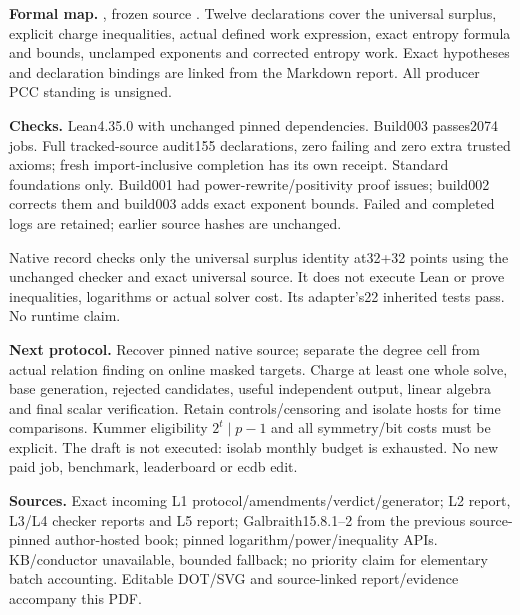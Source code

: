 \documentclass[11pt]{article}
\begin{document}
\textbf{Formal map.} , frozen source
. Twelve declarations cover the universal surplus, explicit
charge inequalities, actual defined work expression, exact entropy formula
and bounds, unclamped exponents and corrected entropy work. Exact hypotheses
and declaration bindings are linked from the Markdown report. All producer
PCC standing is unsigned.

\textbf{Checks.} Lean4.35.0 with unchanged pinned dependencies. Build003
passes2074 jobs. Full tracked-source audit155 declarations, zero failing and
zero extra trusted axioms; fresh import-inclusive completion has its own
receipt. Standard foundations only. Build001 had power-rewrite/positivity
proof issues; build002 corrects them and build003 adds exact exponent bounds.
Failed and completed logs are retained; earlier source hashes are unchanged.

Native record  checks only the universal surplus
identity at32+32 points using the unchanged checker and exact universal source.
It does not execute Lean or prove inequalities, logarithms or actual solver
cost. Its adapter's22 inherited tests pass. No runtime claim.

\textbf{Next protocol.} Recover pinned native source; separate the degree
cell from actual relation finding on online masked targets. Charge at least one
whole solve, base generation, rejected candidates, useful independent output,
linear algebra and final scalar verification. Retain controls/censoring and
isolate hosts for time comparisons. Kummer eligibility $2^t\mid p-1$ and all
symmetry/bit costs must be explicit. The draft is not executed: isolab monthly
budget is exhausted. No new paid job, benchmark, leaderboard or ecdb edit.

\textbf{Sources.} Exact incoming L1 protocol/amendments/verdict/generator;
L2 report, L3/L4 checker reports and L5 report; Galbraith15.8.1--2 from the
previous source-pinned author-hosted book; pinned logarithm/power/inequality
APIs. KB/conductor unavailable, bounded fallback; no priority claim for elementary
batch accounting. Editable DOT/SVG and source-linked report/evidence accompany
this PDF.
\end{document}
